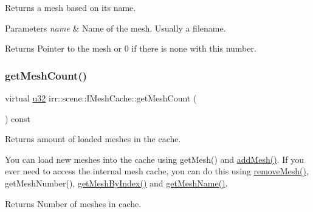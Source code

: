 Returns a mesh based on its name. 


\begin{DoxyParams}{Parameters}
{\em name} & Name of the mesh. Usually a filename. \\
\hline
\end{DoxyParams}
\begin{DoxyReturn}{Returns}
Pointer to the mesh or 0 if there is none with this number. 
\end{DoxyReturn}
\mbox{\label{classirr_1_1scene_1_1IMeshCache_a9dc99e46309a6ef494ef7672c9b49853}} 
\subsubsection{\texorpdfstring{get\+Mesh\+Count()}{getMeshCount()}}
{\footnotesize\ttfamily virtual \hyperlink{namespaceirr_a0416a53257075833e7002efd0a18e804}{u32} irr\+::scene\+::\+I\+Mesh\+Cache\+::get\+Mesh\+Count (\begin{DoxyParamCaption}{ }\end{DoxyParamCaption}) const\hspace{0.3cm}{\ttfamily [pure virtual]}}



Returns amount of loaded meshes in the cache. 

You can load new meshes into the cache using get\+Mesh() and \hyperlink{classirr_1_1scene_1_1IMeshCache_a2959812a3a393817b1db42761766c49b}{add\+Mesh()}. If you ever need to access the internal mesh cache, you can do this using \hyperlink{classirr_1_1scene_1_1IMeshCache_aa82078b06fdcaa332b44a59e4027f921}{remove\+Mesh()}, get\+Mesh\+Number(), \hyperlink{classirr_1_1scene_1_1IMeshCache_a06e7755013445f9bc3d7339fbd009e31}{get\+Mesh\+By\+Index()} and \hyperlink{classirr_1_1scene_1_1IMeshCache_af06efb8fb21f6bba16e52d879b5d3ddd}{get\+Mesh\+Name()}. \begin{DoxyReturn}{Returns}
Number of meshes in cache. 
\end{DoxyReturn}
\mbox{\label{classirr_1_1scene_1_1IMeshCache_afda96c4fb8ab272f3d3688dcaef3abc3}} 
